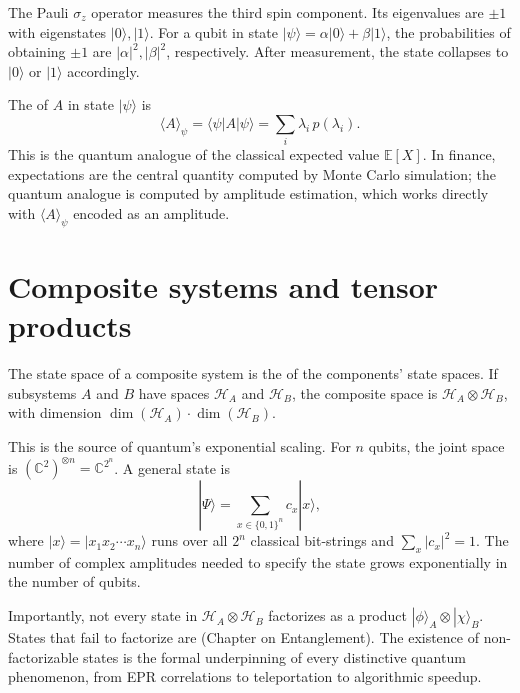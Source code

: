 \begin{example}
The Pauli $\sigma_z$ operator measures the third spin component. Its eigenvalues are $\pm 1$ with eigenstates $|0\rangle, |1\rangle$. For a qubit in state $|\psi\rangle = \alpha|0\rangle + \beta|1\rangle$, the probabilities of obtaining $\pm 1$ are $|\alpha|^2, |\beta|^2$, respectively. After measurement, the state collapses to $|0\rangle$ or $|1\rangle$ accordingly.
\end{example}

The  of $A$ in state $|\psi\rangle$ is
\[
  \langle A\rangle_\psi = \langle\psi|A|\psi\rangle = \sum_i \lambda_i\,p(\lambda_i).
\]
This is the quantum analogue of the classical expected value $\mathbb{E}[X]$. In finance, expectations are the central quantity computed by Monte Carlo simulation; the quantum analogue is computed by amplitude estimation, which works directly with $\langle A\rangle_\psi$ encoded as an amplitude.

\section{Composite systems and tensor products}

The state space of a composite system is the  of the components' state spaces. If subsystems $A$ and $B$ have spaces $\mathcal{H}_A$ and $\mathcal{H}_B$, the composite space is $\mathcal{H}_A \otimes \mathcal{H}_B$, with dimension $\dim(\mathcal{H}_A)\cdot\dim(\mathcal{H}_B)$.

This is the source of quantum's exponential scaling. For $n$ qubits, the joint space is $(\mathbb{C}^2)^{\otimes n} = \mathbb{C}^{2^n}$. A general state is
\[
  |\Psi\rangle = \sum_{x \in \{0,1\}^n} c_x |x\rangle,
\]
where $|x\rangle = |x_1 x_2 \cdots x_n\rangle$ runs over all $2^n$ classical bit-strings and $\sum_x |c_x|^2 = 1$. The number of complex amplitudes needed to specify the state grows exponentially in the number of qubits.

Importantly, not every state in $\mathcal{H}_A \otimes \mathcal{H}_B$ factorizes as a product $|\phi\rangle_A \otimes |\chi\rangle_B$. States that fail to factorize are  (Chapter on Entanglement). The existence of non-factorizable states is the formal underpinning of every distinctive quantum phenomenon, from EPR correlations to teleportation to algorithmic speedup.

